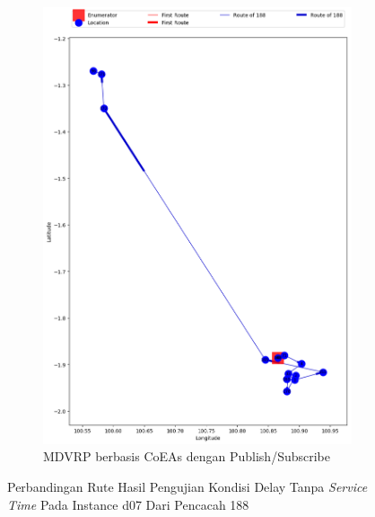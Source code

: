 \begin{figure}[H]\ContinuedFloat
	\centering
	\begin{subfigure}[t]{\textwidth}
		\centering
		\includegraphics[width=\textwidth]{Resources/Images/delayed_7/real_m15_n100_delayed_7_188_pubsub_coes}
		\caption{MDVRP berbasis CoEAs dengan Publish/Subscribe}
		\label{fig:real_m15_n100_delayed_7_188_pubsub_coes}
	\end{subfigure}
	\caption{Perbandingan Rute Hasil Pengujian Kondisi Delay Tanpa \textit{Service Time} Pada Instance d07 Dari Pencacah 188}
	\label{fig:real_m15_n100_delayed_7_188_contd}
\end{figure}


